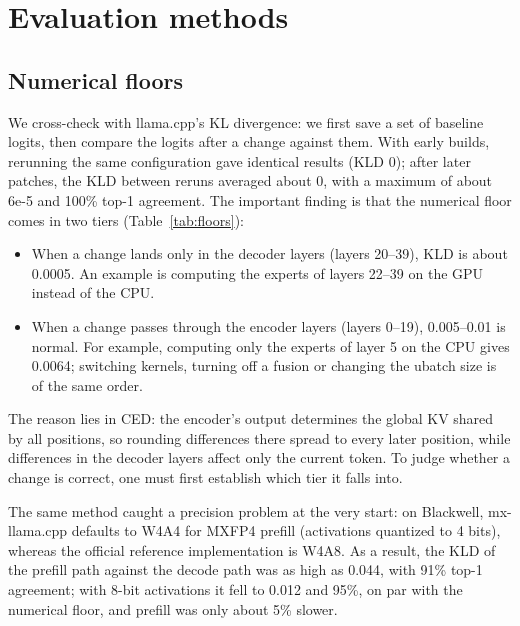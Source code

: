 \documentclass[11pt,a4paper]{article}
\begin{document}
\section{Evaluation methods}

\subsection{Numerical floors}
\label{sec:floors}

We cross-check with llama.cpp's KL divergence: we first save a set of baseline logits, then compare the logits after a change against them. With early builds, rerunning the same configuration gave identical results (KLD 0); after later patches, the KLD between reruns averaged about 0, with a maximum of about 6e-5 and 100\% top-1 agreement. The important finding is that the numerical floor comes in two tiers (Table~\ref{tab:floors}):

\begin{itemize}
  \item When a change lands only in the decoder layers (layers 20--39), KLD is about 0.0005. An example is computing the experts of layers 22--39 on the GPU instead of the CPU.
  \item When a change passes through the encoder layers (layers 0--19), 0.005--0.01 is normal. For example, computing only the experts of layer 5 on the CPU gives 0.0064; switching kernels, turning off a fusion or changing the ubatch size is of the same order.
\end{itemize}

The reason lies in CED: the encoder's output determines the global KV shared by all positions, so rounding differences there spread to every later position, while differences in the decoder layers affect only the current token. To judge whether a change is correct, one must first establish which tier it falls into.

The same method caught a precision problem at the very start: on Blackwell, mx-llama.cpp defaults to W4A4 for MXFP4 prefill (activations quantized to 4 bits), whereas the official reference implementation is W4A8. As a result, the KLD of the prefill path against the decode path was as high as 0.044, with 91\% top-1 agreement; with 8-bit activations it fell to 0.012 and 95\%, on par with the numerical floor, and prefill was only about 5\% slower.
\end{document}
